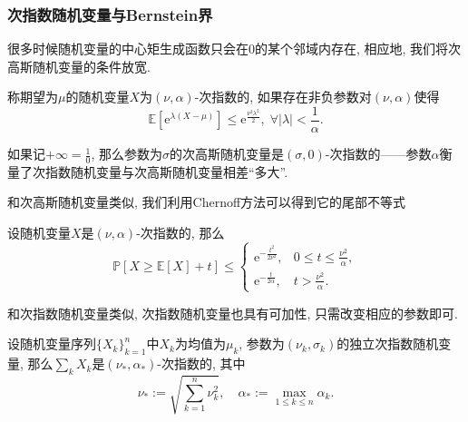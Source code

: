 \subsubsection{次指数随机变量与Bernstein界}

很多时候随机变量的中心矩生成函数只会在$0$的某个邻域内存在, 相应地, 我们将次高斯随机变量的条件放宽. 
\begin{definition}[次指数随机变量]
	称期望为$\mu$的随机变量$X$为$(\nu, \alpha)$-次指数的, 如果存在非负参数对$(\nu, \alpha)$使得
	\begin{equation*}
		\mathbb{E}[ \mathrm{e}^{\lambda(X - \mu)} ] 
		\leq \mathrm{e}^{\frac{\nu^2 \lambda^2}{2}},\; 
		\forall |\lambda| < \frac{1}{\alpha}. 
	\end{equation*}
\end{definition}
\noindent
如果记$+\infty = \frac10$, 那么参数为$\sigma$的次高斯随机变量是$(\sigma, 0)$-次指数的——参数$\alpha$衡量了次指数随机变量与次高斯随机变量相差“多大”. 

和次高斯随机变量类似, 我们利用Chernoff方法可以得到它的尾部不等式
\begin{proposition}[次指数随机变量的上偏差不等式]\label{prop:UpperDeviationOfSubExpRV}
	设随机变量$X$是$(\nu, \alpha)$-次指数的, 那么
	\begin{equation*}
		\mathbb{P}[X \geq \mathbb{E}[X] + t] \leq 
		\begin{cases}
			\mathrm{e}^{-\frac{t^2}{2 \nu^2}}, & 0 \leq t \leq \frac{\nu^2}{\alpha}, \\
			\mathrm{e}^{-\frac{t}{2 \alpha}}, & t > \frac{\nu^2}{\alpha}.
		\end{cases}
	\end{equation*}
\end{proposition}

和次指数随机变量类似, 次指数随机变量也具有可加性, 只需改变相应的参数即可. 
\begin{proposition}
	设随机变量序列$\{X_k\}_{k=1}^n$中$X_k$为均值为$\mu_k$, 参数为$(\nu_k, \sigma_k)$的独立次指数随机变量, 那么$\sum_k X_k$是$(\nu_*, \alpha_*)$-次指数的, 其中
	\begin{equation*}
		\nu_* := \sqrt{\sum_{k=1}^n \nu_k^2}, \quad
		\alpha_* := \max_{1 \leq k \leq n} \alpha_k. 
	\end{equation*}
\end{proposition}

